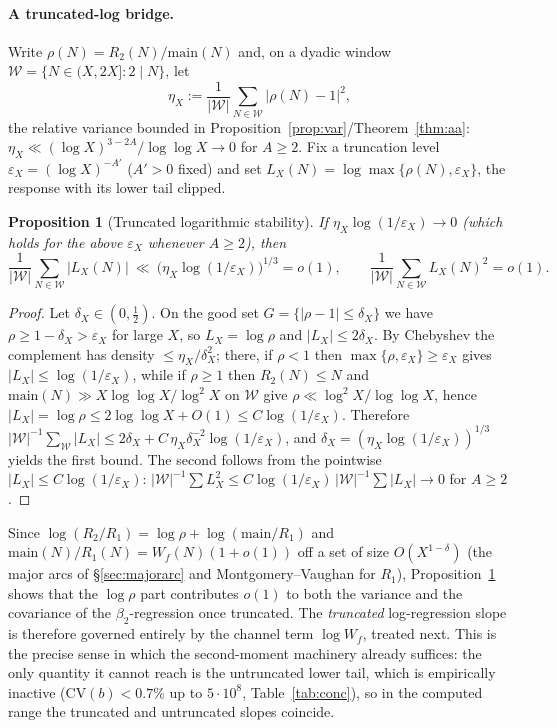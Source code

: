 \documentclass[]{interact}%
\newtheorem{proposition}{Proposition}
\begin{document}
\paragraph{A truncated-log bridge.}
Write $\rho(N)=R_2(N)/\mathrm{main}(N)$ and, on a dyadic window
$\mathcal W=\{N\in(X,2X]:2\mid N\}$, let
\[
  \eta_X:=\frac1{|\mathcal W|}\sum_{N\in\mathcal W}\big|\rho(N)-1\big|^2 ,
\]
the relative variance bounded in Proposition~\ref{prop:var}/Theorem~\ref{thm:aa}:
$\eta_X\ll(\log X)^{3-2A}/\log\log X\to0$ for $A\ge2$. Fix a truncation level
$\varepsilon_X=(\log X)^{-A'}$ ($A'>0$ fixed) and set
$L_X(N)=\log\max\{\rho(N),\varepsilon_X\}$, the response with its lower tail clipped.

\begin{proposition}[Truncated logarithmic stability]\label{prop:trunc}
If $\eta_X\log(1/\varepsilon_X)\to0$ (which holds for the above $\varepsilon_X$ whenever
$A\ge2$), then
\[
  \frac1{|\mathcal W|}\sum_{N\in\mathcal W}\big|L_X(N)\big|
  \ \ll\ \big(\eta_X\log(1/\varepsilon_X)\big)^{1/3}=o(1),
  \qquad
  \frac1{|\mathcal W|}\sum_{N\in\mathcal W}L_X(N)^2=o(1).
\]
\end{proposition}

\begin{proof}
Let $\delta_X\in(0,\tfrac12)$. On the good set $G=\{|\rho-1|\le\delta_X\}$ we have
$\rho\ge1-\delta_X>\varepsilon_X$ for large $X$, so $L_X=\log\rho$ and $|L_X|\le2\delta_X$. By
Chebyshev the complement has density $\le\eta_X/\delta_X^2$; there, if $\rho<1$ then
$\max\{\rho,\varepsilon_X\}\ge\varepsilon_X$ gives $|L_X|\le\log(1/\varepsilon_X)$, while if
$\rho\ge1$ then $R_2(N)\le N$ and $\mathrm{main}(N)\gg X\log\log X/\log^2X$ on $\mathcal W$
give $\rho\ll\log^2X/\log\log X$, hence $|L_X|=\log\rho\le2\log\log X+O(1)\le
C\log(1/\varepsilon_X)$. Therefore
$|\mathcal W|^{-1}\sum_{\mathcal W}|L_X|\le2\delta_X+C\,\eta_X\delta_X^{-2}\log(1/\varepsilon_X)$,
and $\delta_X=(\eta_X\log(1/\varepsilon_X))^{1/3}$ yields the first bound. The second follows
from the pointwise $|L_X|\le C\log(1/\varepsilon_X)$:
$|\mathcal W|^{-1}\sum L_X^2\le C\log(1/\varepsilon_X)\,|\mathcal W|^{-1}\sum|L_X|\to0$ for
$A\ge2$.
\end{proof}

Since $\log(R_2/R_1)=\log\rho+\log(\mathrm{main}/R_1)$ and
$\mathrm{main}(N)/R_1(N)=W_f(N)(1+o(1))$ off a set of size $O(X^{1-\delta})$ (the
major arcs of \S\ref{sec:majorarc} and Montgomery--Vaughan for $R_1$),
Proposition~\ref{prop:trunc} shows that the $\log\rho$ part contributes $o(1)$ to both the
variance and the covariance of the $\beta_2$-regression once truncated. The \emph{truncated}
log-regression slope is therefore governed entirely by the channel term $\log W_f$,
treated next. This is the precise sense in which the second-moment machinery already
suffices: the only quantity it cannot reach is the untruncated lower tail, which is
empirically inactive ($\mathrm{CV}(b)<0.7\%$ up to $5\cdot10^{8}$, Table~\ref{tab:conc}), so
in the computed range the truncated and untruncated slopes coincide.
\end{document}
